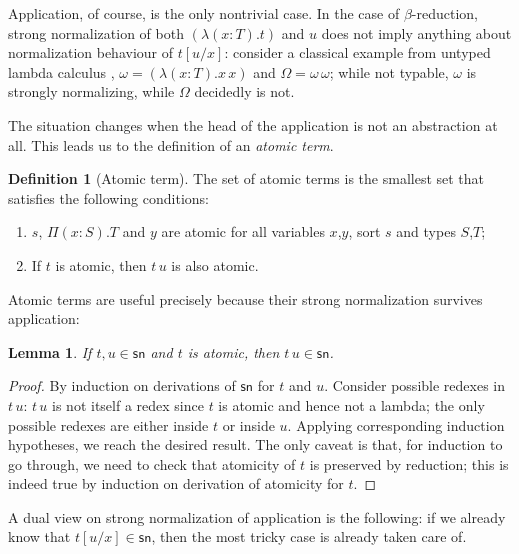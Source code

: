 \documentclass{article}
\newtheorem{lemma}{Lemma}
\theoremstyle{definition}
\newtheorem{definition}{Definition}
\theoremstyle{remark}
\begin{document}
Application, of course, is the only nontrivial case. In
the case of $\beta$-reduction, strong normalization of
both $(\lambda(x:T).t)$ and $u$ does not imply anything
about normalization behaviour of $t[u/x]$: consider a
classical example from untyped lambda calculus \cite{
barendregt1984lambda}, $\omega=(\lambda(x:T).x\,x)$ and
$\Omega=\omega\,\omega$; while not typable, $\omega$ is
strongly normalizing, while $\Omega$ decidedly is not.

The situation changes when the head of the application
is not an abstraction at all. This leads us to the
definition of an \textit{atomic term}.

\begin{definition}[Atomic term]
    The set of atomic terms is the smallest set
    that satisfies the following conditions:
    \begin{enumerate}
        \item $s$, $\Pi(x:S).T$ and $y$ are atomic for
            all variables $x$,$y$, sort $s$ and types
            $S$,$T$;
        \item If $t$ is atomic, then $t\,u$ is also
            atomic.
    \end{enumerate}
\end{definition}

Atomic terms are useful precisely because their strong
normalization survives application:

\begin{lemma}
\label{sn-atomic}
    If $t,u\in\mathsf{sn}$ and $t$ is atomic, then
    $t\,u\in\mathsf{sn}$.\;
\end{lemma}
\begin{proof}
    By induction on derivations of $\mathsf{sn}$ for
    $t$ and $u$. Consider possible redexes in $t\,u$:
    $t\,u$ is not itself a redex since $t$ is atomic
    and hence not a lambda; the only possible redexes
    are either inside $t$ or inside $u$. Applying
    corresponding induction hypotheses, we reach the
    desired result. The only caveat is that, for
    induction to go through, we need to check that
    atomicity of $t$ is preserved by reduction; this is
    indeed true by induction on derivation of atomicity
    for $t$.
\end{proof}

A dual view on strong normalization of application is
the following: if we already know that
$t[u/x]\in\mathsf{sn}$, then the most tricky case is
already taken care of.
\end{document}
